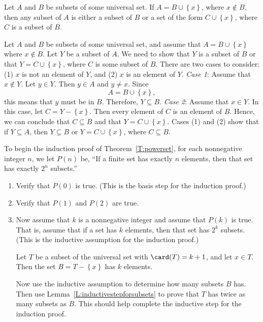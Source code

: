 \begin{enumerate}
\begin{lemma} \label{L:inductivestepforsubsets}
Let $A$ and $B$ be subsets of some universal set.  If  $A = B \cup \left\{ x \right\}$, where  $x \notin B$, then any subset of  $A$  is either a subset of  $B$  or a set of the form   
$C \cup \left\{ x \right\}$, where  $C$  is a subset of  $B$.
\end{lemma}
%
\begin{myproof}
Let $A$ and $B$ be subsets of some universal set, and assume that  $A = B \cup \left\{ x \right\}$ where  $x \notin B$.  Let  $Y$  be a subset of  $A$.  We need to show that  $Y$  is a subset of  $B$  or that   $Y = C \cup \left\{ x \right\}$, where  $C$   is some subset of  $B$.  There are two cases to consider:  (1)  $x$  is not an element of  $Y$\!, and (2)  $x$  is an element of  $Y$\!.
\vskip6pt
\noindent
\textit{Case 1}:   Assume that  $x \notin Y$\!.  Let  $y \in Y$.  Then  $y \in A$  and  
$y \ne x$.  Since  
\[
A = B \cup \left\{ x \right\}\!,
\]
this means that  $y$  must be in  $B$.  Therefore,  $Y \subseteq B$\!.
\vskip6pt
\noindent
\textit{Case 2}:  Assume that  $x \in Y$\!. In this case, let  $C = Y - \left\{ x \right\}$.  Then every element of  $C$  is an element of  $B$. Hence, we can conclude that  $C \subseteq B$  and that  $Y = C \cup \left\{ x \right\}$.
\vskip10pt
\noindent
Cases (1) and (2) show that if  $Y \subseteq A$, then  $Y \subseteq B$  or  
$Y = C \cup \left\{ x \right\}$,  where  \linebreak
$C \subseteq B$.
\end{myproof}

%
%
To begin the induction proof of Theorem~\ref{T:powerset}, for each nonnegative integer $n$, we let $P ( n )$ be, ``If   a finite set has exactly $n$  elements, then  that set  has exactly  $2^n $ subsets.''
\begin{enumerate}
\item Verify that $P ( 0 )$ is true.  (This is the basis step for the induction proof.)

\item Verify that $P( 1 )$ and $P( 2 )$ are true.

\item Now assume that  $k$  is a nonnegative integer and assume that $P( k )$ is true.  That is, assume that if a set has  $k$  elements, then that set has  $2^k $  subsets.  (This is the inductive assumption for the induction proof.)

Let  $T$  be a subset of the universal set with  $\card (T) = k + 1$, and let  
$x \in T$.  Then the set  $B = T - \left\{ x \right\}$ has  $k$  elements.

Now use the inductive assumption to determine how many subsets  $B$  has.  Then use  Lemma~\ref{L:inductivestepforsubsets} to prove that  $T$  has twice as many subsets as  $B$.  This should help complete the inductive step for the induction proof.
\end{enumerate}

\end{enumerate}
\hbreak


\endinput
